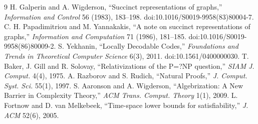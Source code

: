 \documentclass[11pt]{article}
\begin{document}
\begin{thebibliography}{9}
 H. Galperin and A. Wigderson,
``Succinct representations of graphs,'' \emph{Information and Control}
56 (1983), 183--198. doi:10.1016/S0019-9958(83)80004-7.
 C. H. Papadimitriou and M. Yannakakis,
``A note on succinct representations of graphs,'' \emph{Information and
Computation} 71 (1986), 181--185. doi:10.1016/S0019-9958(86)80009-2.
 S. Yekhanin, ``Locally Decodable Codes,''
\emph{Foundations and Trends in Theoretical Computer Science} 6(3), 2011.
doi:10.1561/0400000030.
 T. Baker, J. Gill and R. Solovay,
``Relativizations of the P=?NP question,'' \emph{SIAM J. Comput.} 4(4), 1975.
 A. Razborov and S. Rudich, ``Natural Proofs,''
\emph{J. Comput. Syst. Sci.} 55(1), 1997.
 S. Aaronson and A. Wigderson, ``Algebrization: A New Barrier
in Complexity Theory,'' \emph{ACM Trans. Comput. Theory} 1(1), 2009.
 L. Fortnow and D. van Melkebeek,
``Time-space lower bounds for satisfiability,'' \emph{J. ACM} 52(6), 2005.
\end{thebibliography}

\end{document}
